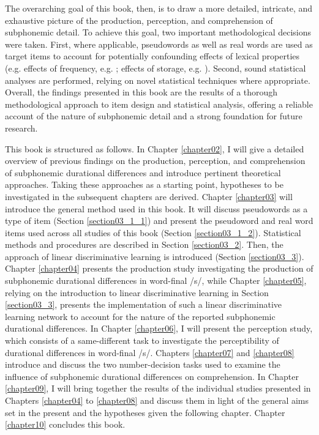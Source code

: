 The overarching goal of this book, then, is to draw a more detailed, intricate, and exhaustive picture of the production, perception, and comprehension of subphonemic detail. To achieve this goal, two important methodological decisions were taken. First, where applicable, pseudowords as well as real words are used as target items to account for potentially confounding effects of lexical properties (e.g. effects of frequency, e.g. \cite{Gahl2008, Lohmann2018}; effects of storage, e.g. \cite{Caselli2016}). Second, sound statistical analyses are performed, relying on novel statistical techniques where appropriate. Overall, the findings presented in this book are the results of a thorough methodological approach to item design and statistical analysis, offering a reliable account of the nature of subphonemic detail and a strong foundation for future research.

This book is structured as follows. In Chapter \ref{chapter02}, I will give a detailed overview of previous findings on the production, perception, and comprehension of subphonemic durational differences and introduce pertinent theoretical approaches. Taking these approaches as a starting point, hypotheses to be investigated in the subsequent chapters are derived. Chapter \ref{chapter03} will introduce the general method used in this book. It will discuss pseudowords as a type of item (Section \ref{section03_1_1}) and present the pseudoword and real word items used across all studies of this book (Section \ref{section03_1_2}). Statistical methods and procedures are described in Section \ref{section03_2}. Then, the approach of linear discriminative learning is introduced (Section \ref{section03_3}). Chapter \ref{chapter04} presents the production study investigating the production of subphonemic durational differences in word-final /s/, while Chapter \ref{chapter05}, relying on the introduction to linear discriminative learning in Section \ref{section03_3}, presents the implementation of such a linear discriminative learning network to account for the nature of the reported subphonemic durational differences. In Chapter \ref{chapter06}, I will present the perception study, which consists of a same-different task to investigate the perceptibility of durational differences in word-final /s/. Chapters \ref{chapter07} and \ref{chapter08} introduce and discuss the two number-decision tasks used to examine the influence of subphonemic durational differences on comprehension. In Chapter \ref{chapter09}, I will bring together the results of the individual studies presented in Chapters \ref{chapter04} to \ref{chapter08} and discuss them in light of the general aims set in the present and the hypotheses given the following chapter. Chapter \ref{chapter10} concludes this book.